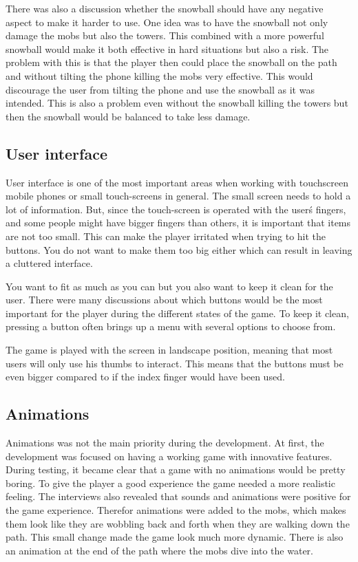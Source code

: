 There was also a discussion whether the snowball should have any negative aspect to make it harder to use. One idea was to have the snowball not only damage the mobs but also the towers. This combined with a more powerful snowball would make it both effective in hard situations but also a risk. The problem with this is that the player then could place the snowball on the path and without tilting the phone killing the mobs very effective. This would discourage the user from tilting the phone and use the snowball as it was intended. This is also a problem even without the snowball killing the towers but then the snowball would be balanced to take less damage.

\subsection{User interface}

User interface is one of the most important areas when working with touchscreen mobile phones or small touch-screens in general. The small screen needs to hold a lot of information. But,  since the touch-screen is operated with the user\'s fingers, and some people might have bigger fingers than others, it is important that items are not too small. This can make the player irritated when trying to hit the buttons. You do not want to make them too big either which can result in leaving a cluttered interface.  

You want to fit as much as you can but you also want to keep it clean for the user. There were many discussions about which buttons would be the most important for the player during the different states of the game. To keep it clean, pressing a button often brings up a menu with several options to choose from.

The game is played with the screen in landscape position, meaning that most users will only use his thumbs to interact. This means that the buttons must be even bigger compared to if the index finger would have been used.
\subsection{Animations}

Animations was not the main priority during the development. At first, the development was focused on having a working game with innovative features. During testing, it became clear that a game with no animations would be pretty boring. To give the player a good experience the game needed a more realistic feeling. The interviews also revealed that sounds and animations were positive for the game experience. Therefor animations were added to the mobs, which makes them look like they are wobbling back and forth when they are walking down the path. This small change made the game look much more dynamic. There is also an animation at the end of the path where the mobs dive into the water. 
